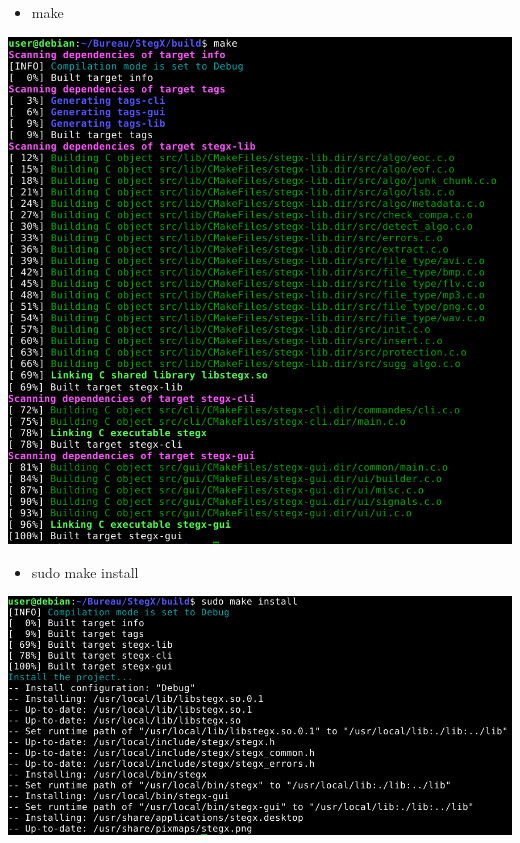 \documentclass[11pt]{article}
\begin{document}
\begin{itemize}
\item make
\end{itemize}

\hspace{1cm}
\vspace{0.5cm}
\includegraphics[scale=0.5]{pictures/make.png}


\begin{itemize}
\item sudo make install
\end{itemize}

\hspace{1cm}
\vspace{0.5cm}
\includegraphics[scale=0.5]{pictures/install.png}
\end{document}
